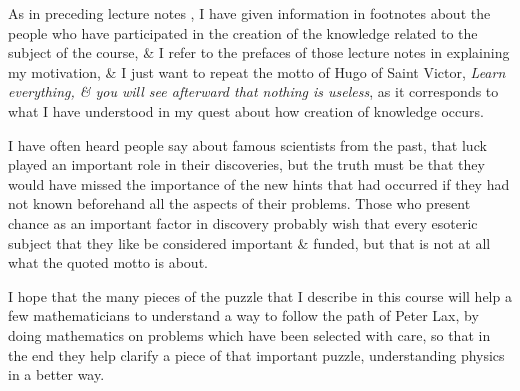 \documentclass{article}
\begin{document}
\begin{enumerate}
	As in preceding lecture notes \cite{Tartar2006,Tartar2007}, I have given information in footnotes about the people who have participated in the creation of the knowledge related to the subject of the course, \& I refer to the prefaces of those lecture notes in explaining my motivation, \& I just want to repeat the motto of {\sc Hugo} of Saint {\sc Victor}, {\it Learn everything, \& you will see afterward that nothing is useless}, as it corresponds to what I have understood in my quest about how creation of knowledge occurs.
	
	I have often heard people say about famous scientists from the past, that luck played an important role in their discoveries, but the truth must be that they would have missed the importance of the new hints that had occurred if they had not known beforehand all the aspects of their problems. Those who present chance as an important factor in discovery probably wish that every esoteric subject that they like be considered important \& funded, but that is not at all what the quoted motto is about.
	
	I hope that the many pieces of the puzzle that I describe in this course will help a few mathematicians to understand a way to follow the path of {\sc Peter Lax}, by doing mathematics on problems which have been selected with care, so that in the end they help clarify a piece of that important puzzle, understanding physics in a better way.
	

\end{enumerate}
\end{document}
